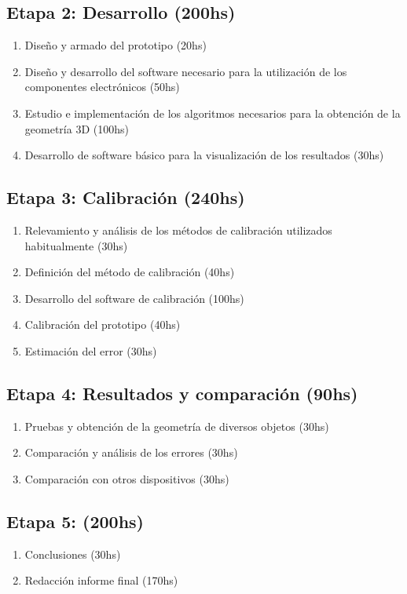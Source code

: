 \subsection{Etapa 2: Desarrollo (200hs)}
\begin{enumerate}
\item Diseño y armado del prototipo (20hs)
\item Diseño y desarrollo del software necesario para la utilización de los componentes electrónicos (50hs)
\item Estudio e implementación de los algoritmos necesarios para la obtención de la geometría 3D (100hs)
\item Desarrollo de software básico para la visualización de los resultados (30hs)
\end{enumerate}

\subsection{Etapa 3: Calibración (240hs)}
\begin{enumerate}
\item Relevamiento y análisis de los métodos de calibración utilizados habitualmente (30hs)
\item Definición del método de calibración (40hs)
\item Desarrollo del software de calibración (100hs)
\item Calibración del prototipo (40hs)
\item Estimación del error (30hs)
\end{enumerate}

\subsection{Etapa 4: Resultados y comparación (90hs)}
\begin{enumerate}
\item Pruebas y obtención de la geometría de diversos objetos (30hs)
\item Comparación y análisis de los errores (30hs)
\item Comparación con otros dispositivos (30hs)
\end{enumerate}

\subsection{Etapa 5: (200hs)}
\begin{enumerate}
\item Conclusiones (30hs)
\item Redacción informe final (170hs)
\end{enumerate}

